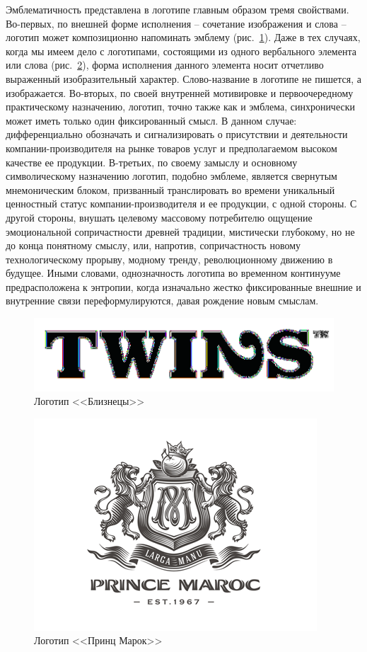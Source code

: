 Эмблематичность представлена в логотипе главным образом тремя свойствами. Во-первых, по внешней
форме исполнения -- сочетание изображения и слова -- логотип может композиционно напоминать
эмблему (рис.~\ref{fig:twins}). Даже в тех случаях, когда мы имеем дело с логотипами, состоящими из
одного вербального элемента или слова (рис.~\ref{fig:maroc}), форма исполнения данного элемента
носит отчетливо выраженный изобразительный характер. Слово-название в логотипе не пишется, а
изображается. Во-вторых, по своей внутренней мотивировке и первоочередному практическому назначению,
логотип, точно также как и эмблема, синхронически может иметь только один фиксированный смысл. В
данном случае: дифференциально обозначать и сигнализировать о присутствии и деятельности
компании-производителя на рынке товаров услуг и предполагаемом высоком качестве ее
продукции. В-третьих, по своему замыслу и основному символическому назначению логотип, подобно
эмблеме, является свернутым мнемоническим блоком, призванный транслировать во времени уникальный
ценностный статус компании-производителя и ее продукции, с одной стороны.  С другой стороны, внушать
целевому массовому потребителю ощущение эмоциональной сопричастности древней традиции, мистически
глубокому, но не до конца понятному смыслу, или, напротив, сопричастность новому технологическому
прорыву, модному тренду, революционному движению в будущее.  Иными словами, однозначность логотипа
во временном континууме предрасположена к энтропии, когда изначально жестко фиксированные внешние и
внутренние связи переформулируются, давая рождение новым смыслам.

\begin{figure}[h!]
  \centering
  \includegraphics[width=.5\linewidth]{images/twins}
  \caption{Логотип <<Близнецы>>}
  \label{fig:twins}
\end{figure}

\begin{figure}[h!]
  \centering
  \includegraphics[width=.5\linewidth]{images/maroc}
  \caption{Логотип <<Принц Марок>>}
  \label{fig:maroc}
\end{figure}

